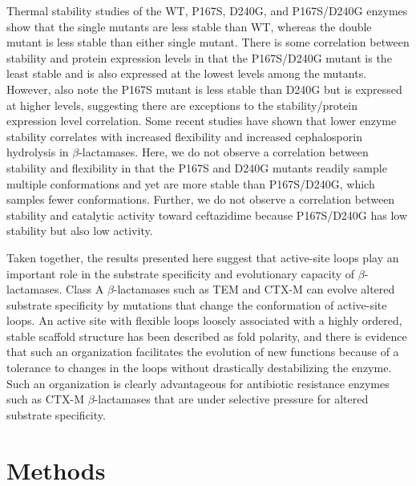 \documentclass[../main.tex]{subfiles}
\begin{document}
        Thermal stability studies of the WT, P167S, D240G, and P167S/D240G enzymes show that the single mutants are less stable than WT, whereas the double mutant is less stable than either single mutant. There is some correlation between stability and protein expression levels in that the P167S/D240G mutant is the least stable and is also expressed at the lowest levels among the mutants. However, also note the P167S mutant is less stable than D240G but is expressed at higher levels, suggesting there are exceptions to the stability/protein expression level correlation. Some recent studies have shown that lower enzyme stability correlates with increased flexibility and increased cephalosporin hydrolysis in $\beta$-lactamases\cite{frohlich_oxa-48-mediated_2019,barnes_deciphering_2018}. Here, we do not observe a correlation between stability and flexibility in that the P167S and D240G mutants readily sample multiple conformations and yet are more stable than P167S/D240G, which samples fewer conformations. Further, we do not observe a correlation between stability and catalytic activity toward ceftazidime because P167S/D240G has low stability but also low activity.

        Taken together, the results presented here suggest that active-site loops play an important role in the substrate specificity and evolutionary capacity of $\beta$-lactamases. Class A $\beta$-lactamases such as TEM and CTX-M can evolve altered substrate specificity by mutations that change the conformation of active-site loops. An active site with flexible loops loosely associated with a highly ordered, stable scaffold structure has been described as fold polarity, and there is evidence that such an organization facilitates the evolution of new functions because of a tolerance to changes in the loops without drastically destabilizing the enzyme\cite{dellus-gur_what_2013}. Such an organization is clearly advantageous for antibiotic resistance enzymes such as CTX-M $\beta$-lactamases that are under selective pressure for altered substrate specificity.

    \section{Methods}
\end{document}

